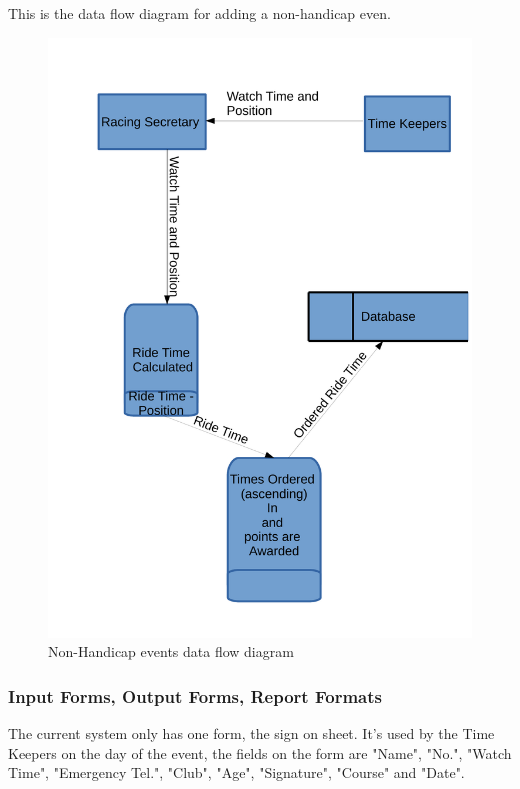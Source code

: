This is the data flow diagram for adding a non-handicap even.
\begin{figure}[H]
    \includegraphics[width=\textwidth]{./Non-HandicapDFD.pdf}
    \caption{Non-Handicap events data flow diagram} \label{fig:non-handicap_DFD}
\end{figure}

\subsubsection{Input Forms, Output Forms, Report Formats}
The current system only has one form, the sign on sheet. It's used by the Time Keepers on the day of the event, the fields on the form are "Name", "No.", "Watch Time", "Emergency Tel.", "Club", "Age", "Signature", "Course" and "Date".

